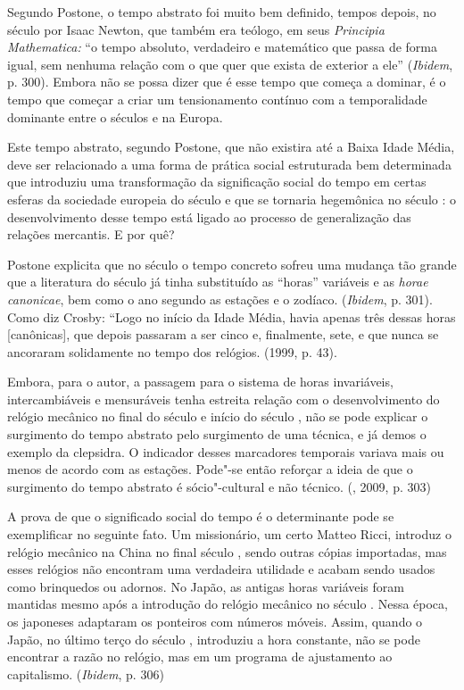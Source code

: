 Segundo Postone, o tempo abstrato foi muito bem definido, tempos depois,
no século  por Isaac Newton, que também era teólogo, em seus
\emph{Principia Mathematica:} ``o tempo absoluto, verdadeiro e
matemático que passa de forma igual, sem nenhuma relação com o que quer
que exista de exterior a ele'' (\emph{Ibidem}, p. 300). Embora não se
possa dizer que é esse tempo que começa a dominar, é o tempo que começar
a criar um tensionamento contínuo com a temporalidade dominante entre o
séculos  e  na Europa.

Este tempo abstrato, segundo Postone, que não existira até a Baixa Idade
Média, deve ser relacionado a uma forma de prática social estruturada
bem determinada que introduziu uma transformação da significação social
do tempo em certas esferas da sociedade europeia do século  e que se
tornaria hegemônica no século : o desenvolvimento desse tempo está
ligado ao processo de generalização das relações mercantis. E por quê?

Postone explicita que no século  o tempo concreto sofreu uma mudança
tão grande que a literatura do século  já tinha substituído as
``horas'' variáveis e as \emph{horae canonicae}, bem como o ano segundo
as estações e o zodíaco. (\emph{Ibidem}, p. 301). Como diz Crosby:
``Logo no início da Idade Média, havia apenas três dessas horas
[canônicas], que depois passaram a ser cinco e, finalmente, sete, e
que nunca se ancoraram solidamente no tempo dos relógios. (1999, p. 43).

Embora, para o autor, a passagem para o sistema de horas invariáveis,
intercambiáveis e mensuráveis tenha estreita relação com o
desenvolvimento do relógio mecânico no final do século  e início do
século , não se pode explicar o surgimento do tempo abstrato pelo
surgimento de uma técnica, e já demos o exemplo da clepsidra. O
indicador desses marcadores temporais variava mais ou menos de acordo
com as estações. Pode"-se então reforçar a ideia de que o surgimento do
tempo abstrato é sócio"-cultural e não técnico. (, 2009, p. 303)

A prova de que o significado social do tempo é o determinante pode se
exemplificar no seguinte fato. Um missionário, um certo Matteo Ricci,
introduz o relógio mecânico na China no final século , sendo outras
cópias importadas, mas esses relógios não encontram uma verdadeira
utilidade e acabam sendo usados como brinquedos ou adornos. No Japão, as
antigas horas variáveis foram mantidas mesmo após a introdução do
relógio mecânico no século . Nessa época, os japoneses adaptaram os
ponteiros com números móveis. Assim, quando o Japão, no último terço do
século , introduziu a hora constante, não se pode encontrar a razão
no relógio, mas em um programa de ajustamento ao capitalismo.
(\emph{Ibidem}, p. 306)


